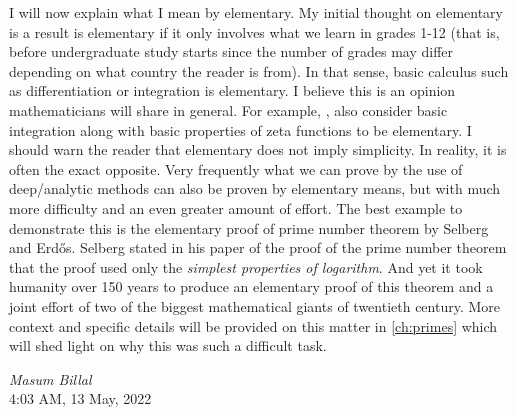 \documentclass[12pt,leqno]{book}
\renewcommand{\thechapter}{\NUMBERstring{chapter}}
\theoremstyle{definition}
\begin{document}
	I will now explain what I mean by elementary. My initial thought on elementary is a result is elementary if it only involves what we learn in grades 1-12 (that is, before undergraduate study starts since the number of grades may differ depending on what country the reader is from). In that sense, basic calculus such as differentiation or integration is elementary. I believe this is an opinion mathematicians will share in general. For example, \textcite{landau_1969}, \textcite{ingham_1932} also consider basic integration along with basic properties of zeta functions to be elementary. I should warn the reader that elementary does not imply simplicity. In reality, it is often the exact opposite. Very frequently what we can prove by the use of deep/analytic methods can also be proven by elementary means, but with much more difficulty and an even greater amount of effort. The best example to demonstrate this is the elementary proof of prime number theorem by Selberg and Erd\H{o}s. Selberg stated in his paper of the proof of the prime number theorem that the proof used only the \textit{simplest properties of logarithm}. And yet it took humanity over 150 years to produce an elementary proof of this theorem and a joint effort of two of the biggest mathematical giants of twentieth century. More context and specific details will be provided on this matter in \autoref{ch:primes} which will shed light on why this was such a difficult task.
	\begin{flushright}
		{\itshape Masum Billal}\\
		4:03 AM, 13 May, 2022
	\end{flushright}
	\frontmatter
    \tableofcontents
    
    \printnomenclature
    \mainmatter
    \pagestyle{fancy}
	\setcounter{chapter}{0}
	
	
	
	
	
	
	
	
	
	
	
	\backmatter
	\printglossary[title=Glossary,]
	\printbibliography[type=article,title=Articles,]
	\printbibliography[filter=books,title=Books,]
    \printindex
\end{document}
